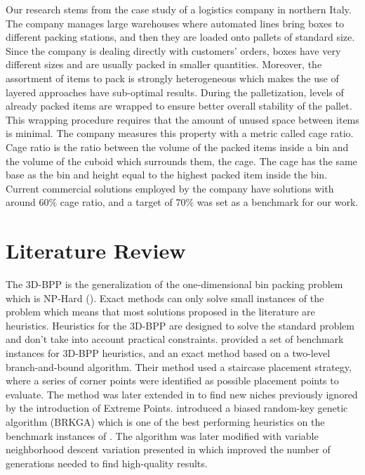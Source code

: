 \documentclass[11pt,a4paper,twocolumn]{article}
\begin{document}
Our research stems from the case study of a logistics company in northern Italy.
The company manages large warehouses where automated lines bring boxes to different packing stations, and then they are loaded onto pallets of standard size.
Since the company is dealing directly with customers' orders, boxes have very different sizes and are usually packed in smaller quantities.
Moreover, the assortment of items to pack is strongly heterogeneous which makes the use of layered approaches have sub-optimal results.
During the palletization, levels of already packed items are wrapped to ensure better overall stability of the pallet.
This wrapping procedure requires that the amount of unused space between items is minimal.
The company measures this property with a metric called cage ratio.
Cage ratio is the ratio between the volume of the packed items inside a bin and the volume of the cuboid which surrounds them, the cage.
The cage has the same base as the bin and height equal to the highest packed item inside the bin.
Current commercial solutions employed by the company have solutions with around $60\%$ cage ratio, and a target of $70\%$ was set as a benchmark for our work.

\section{Literature Review}
The 3D-BPP is the generalization of the one-dimensional bin packing problem which is NP-Hard (\cite{martello2000three}).
Exact methods can only solve small instances of the problem which means that most solutions proposed in the literature are heuristics.
Heuristics for the 3D-BPP are designed to solve the standard problem and don't take into account practical constraints.
\cite{martello2000three} provided a set of benchmark instances for 3D-BPP heuristics, and an exact method based on a two-level branch-and-bound algorithm.
Their method used a staircase placement strategy, where a series of corner points were identified as possible placement points to evaluate.
The method was later extended in \cite{crainic2008extreme} to find new niches previously ignored by the introduction of Extreme Points.
\cite{gonccalves2013biased} introduced a biased random-key genetic algorithm (BRKGA) which is one of the best performing heuristics on the benchmark instances of \cite{martello2000three}.
The algorithm was later modified with variable neighborhood descent variation presented in \cite{zudio2018brkga} which improved the number of generations needed to find high-quality results.
\end{document}
